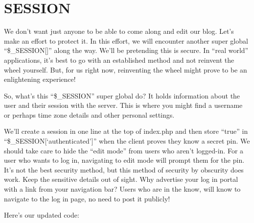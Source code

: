 \documentclass[
]{book}
\begin{document}
\hypertarget{SESSION}{%
\chapter{SESSION}\label{SESSION}}

We don't want just anyone to be able to come along and edit our blog. Let's make an effort to protect it. In this effort, we will encounter another super global ``\$\_SESSION{[}{]}'' along the way. We'll be pretending this is secure. In ``real world'' applications, it's best to go with an established method and not reinvent the wheel yourself. But, for us right now, reinventing the wheel might prove to be an enlightening experience!

So, what's this ``\$\_SESSION'' super global do? It holds information about the user and their session with the server. This is where you might find a username or perhaps time zone details and other personal settings.

We'll create a session in one line at the top of index.php and then store ``true'' in ``\$\_SESSION{[}`authenticated'{]}'' when the client proves they know a secret pin. We should take care to hide the ``edit mode'' from users who aren't logged-in. For a user who wants to log in, navigating to edit mode will prompt them for the pin. It's not the best security method, but this method of security by obscurity does work. Keep the sensitive details out of sight. Why advertise your log in
portal with a link from your navigation bar? Users who are in the know, will know to navigate to the log in page, no need to post it publicly!

Here's our updated code:
\end{document}
